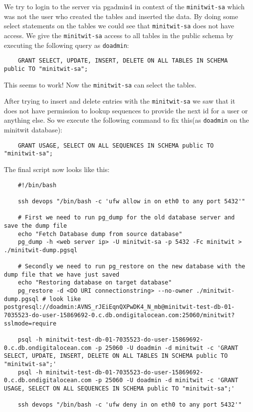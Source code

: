 We try to login to the server via pgadmin4 in context of the \texttt{minitwit-sa} which was not the user who created the tables and inserted the data. By doing some select statements on the tables we could see that \texttt{minitwit-sa} does not have access. We give the \texttt{minitwit-sa} access to all tables in the public schema by executing the following query as \texttt{doadmin}:

\begin{verbatim}
    GRANT SELECT, UPDATE, INSERT, DELETE ON ALL TABLES IN SCHEMA public TO "minitwit-sa";
\end{verbatim}

This seems to work! Now the \texttt{minitwit-sa} can select the tables.

After trying to insert and delete entries with the \texttt{minitwit-sa} we saw that it does not have permission to lookup sequences to provide the next id for a user or anything else. So we execute the following command to fix this(as \texttt{doadmin} on the minitwit database):

\begin{verbatim}
    GRANT USAGE, SELECT ON ALL SEQUENCES IN SCHEMA public TO "minitwit-sa";
\end{verbatim}

The final script now looks like this:

\begin{verbatim}
    #!/bin/bash

    ssh devops "/bin/bash -c 'ufw allow in on eth0 to any port 5432'"

    # First we need to run pg_dump for the old database server and save the dump file
    echo "Fetch Database dump from source database"
    pg_dump -h <web server ip> -U minitwit-sa -p 5432 -Fc minitwit > ./minitwit-dump.pgsql

    # Secondly we need to run pg_restore on the new database with the dump file that we have just saved
    echo "Restoring database on target database"
    pg_restore -d <DO URI connectionstring> --no-owner ./minitwit-dump.pgsql # look like postgresql://doadmin:AVNS_rJEiEqnQXPwDK4_N_mb@minitwit-test-db-01-7035523-do-user-15869692-0.c.db.ondigitalocean.com:25060/minitwit?sslmode=require

    psql -h minitwit-test-db-01-7035523-do-user-15869692-0.c.db.ondigitalocean.com -p 25060 -U doadmin -d minitwit -c 'GRANT SELECT, UPDATE, INSERT, DELETE ON ALL TABLES IN SCHEMA public TO "minitwit-sa";'
    psql -h minitwit-test-db-01-7035523-do-user-15869692-0.c.db.ondigitalocean.com -p 25060 -U doadmin -d minitwit -c 'GRANT USAGE, SELECT ON ALL SEQUENCES IN SCHEMA public TO "minitwit-sa";'

    ssh devops "/bin/bash -c 'ufw deny in on eth0 to any port 5432'"
\end{verbatim}

